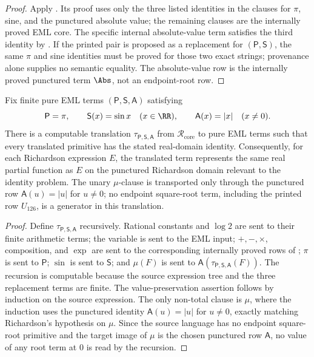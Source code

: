 \begin{proof}
Apply .  Its proof uses only the
three listed identities in the clauses for \(\pi\), sine, and the punctured
absolute value; the remaining clauses are the internally proved EML core.  The
specific internal absolute-value term satisfies the third identity by
.  If the printed pair is proposed as a
replacement for \((\mathsf P,\mathsf S)\), the same \(\pi\) and sine identities
must be proved for those two exact strings; provenance alone supplies no
semantic equality.  The absolute-value row is the internally proved punctured
term \(\Abs\), not an endpoint-root row.
\end{proof}

\begin{lemma}
\label{lem:richardson-translation}
Fix finite pure EML terms \((\mathsf P,\mathsf S,\mathsf A)\) satisfying
\[
  \mathsf P=\pi,
  \qquad \mathsf S(x)=\sin x\quad(x\in\RR),
  \qquad \mathsf A(x)=|x|\quad(x\ne0).
\]
There is a computable translation \(\tau_{\mathsf P,\mathsf S,\mathsf A}\) from
\(\mathcal R_{\mathrm{core}}\) to pure EML terms such that every translated
primitive has the stated real-domain identity.  Consequently, for each
Richardson expression \(E\), the translated term represents the same real partial
function as \(E\) on the punctured Richardson domain relevant to the identity
problem.  The unary \(\mu\)-clause is transported only through the punctured row
\(\mathsf A(u)=|u|\) for \(u\ne0\); no endpoint square-root term, including the
printed row \(U_{126}\), is a generator in this translation.
\end{lemma}

\begin{proof}
Define \(\tau_{\mathsf P,\mathsf S,\mathsf A}\) recursively.  Rational constants
and \(\log2\) are sent to their finite arithmetic terms; the variable is sent to
the EML input; \(+,-,\times\), composition, and \(\exp\) are sent to the
corresponding internally proved rows of ;
\(\pi\) is sent to \(\mathsf P\); \(\sin\) is sent to \(\mathsf S\); and
\(\mu(F)\) is sent to \(\mathsf A(\tau_{\mathsf P,\mathsf S,\mathsf A}(F))\).  The
recursion is computable because the source expression tree and the three
replacement terms are finite.  The value-preservation assertion follows by
induction on the source expression.  The only non-total clause is \(\mu\), where
the induction uses the punctured identity \(\mathsf A(u)=|u|\) for \(u\ne0\),
exactly matching Richardson's hypothesis on \(\mu\).  Since the source language
has no endpoint square-root primitive and the target image of \(\mu\) is the
chosen punctured row \(\mathsf A\), no value of any root term at \(0\) is read by
the recursion.
\end{proof}


